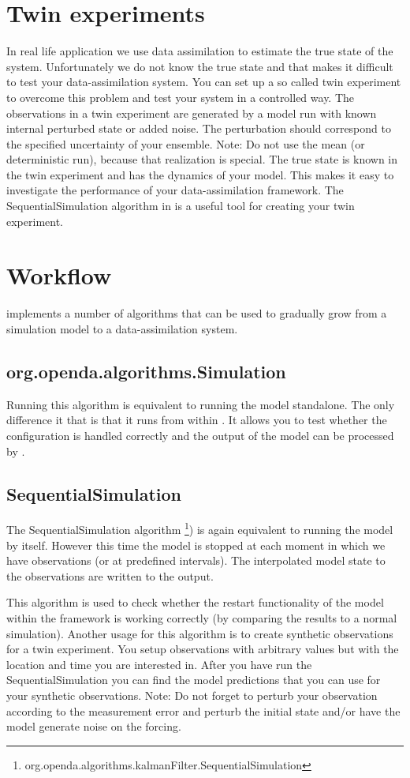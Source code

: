 \section{Twin experiments} \label{Sec:Twin}
In real life application we use data assimilation to estimate the true state of the system. Unfortunately we do not know the true state and that makes it difficult to test your data-assimilation system. You can set up a so called twin experiment to overcome this problem and test your system in a controlled way. The observations in a twin experiment are generated by a model run with known internal perturbed state or added noise. The perturbation should correspond to the specified uncertainty of your ensemble. Note: Do not use the mean (or deterministic run), because that realization is special. The true state is known in the twin experiment and has the dynamics of your model. This makes it easy to investigate the performance of your data-assimilation framework. The SequentialSimulation algorithm in \oda is a useful tool for creating your twin experiment.


\section{Workflow}
\oda implements a number of algorithms that can be used to gradually grow from a simulation model to a data-assimilation system.
\subsection{org.openda.algorithms.Simulation}
Running this algorithm is equivalent to running the model standalone. The only difference it that is that it runs from within \oda. It allows you to test whether the configuration is handled correctly and the output of the model can be processed by \oda. 

\subsection{SequentialSimulation}
The SequentialSimulation algorithm \footnote{org.openda.algorithms.kalmanFilter.SequentialSimulation}) is again equivalent to running the model by itself. However this time the model is stopped at each moment in which we have observations (or at predefined intervals).  The interpolated model state to the observations are written to the output. 

This algorithm is used to check whether the restart functionality of the model within the \oda framework is working correctly (by comparing the results to a normal simulation). Another usage for this algorithm is to create synthetic observations for a twin experiment. You setup observations with arbitrary values but with the location and time you are interested in. After you have run the SequentialSimulation you can find the model predictions that you can use for your synthetic observations. Note: Do not forget to perturb your observation according to the measurement error and perturb the initial state and/or have the model generate noise on the forcing.

